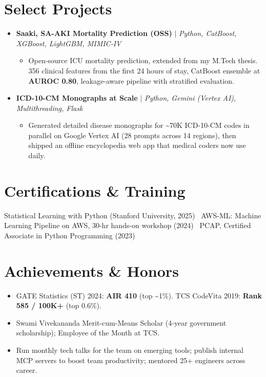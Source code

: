 \documentclass[letterpaper,11pt]{article}
\newcommand{\resumeItem}[1]{\item\small{{#1 \vspace{-2pt}}}}
\newcommand{\resumeProjectHeading}[2]{\item\small #1 #2\vspace{-7pt}}
\newcommand{\resumeSubHeadingListStart}{\begin{itemize}[leftmargin=0.15in, label={}]}
\newcommand{\resumeSubHeadingListEnd}{\end{itemize}}
\newcommand{\resumeItemListStart}{\begin{itemize}}
\newcommand{\resumeItemListEnd}{\end{itemize}\vspace{-5pt}}
\begin{document}
\section{Select Projects}
\resumeSubHeadingListStart

  \resumeProjectHeading
    {\textbf{Saaki, SA-AKI Mortality Prediction (OSS)} $|$ \emph{Python, CatBoost, XGBoost, LightGBM, MIMIC-IV}}{}
    \resumeItemListStart
      \resumeItem{Open-source ICU mortality prediction, extended from my M.Tech thesis. 356 clinical features from the first 24 hours of stay, CatBoost ensemble at \textbf{AUROC 0.80}, leakage-aware pipeline with stratified evaluation.}
    \resumeItemListEnd

  \resumeProjectHeading
    {\textbf{ICD-10-CM Monographs at Scale} $|$ \emph{Python, Gemini (Vertex AI), Multithreading, Flask}}{}
    \resumeItemListStart
      \resumeItem{Generated detailed disease monographs for \textasciitilde 70K ICD-10-CM codes in parallel on Google Vertex AI (28 prompts across 14 regions), then shipped an offline encyclopedia web app that medical coders now use daily.}
    \resumeItemListEnd

\resumeSubHeadingListEnd

\section{Certifications \& Training}
\begin{itemize}[leftmargin=0.15in, label={}]
\small{\item{
Statistical Learning with Python (Stanford University, 2025) \textbar\ AWS-ML: Machine Learning Pipeline on AWS, 30-hr hands-on workshop (2024) \textbar\ PCAP, Certified Associate in Python Programming (2023)
}}
\end{itemize}

\section{Achievements \& Honors}
\begin{itemize}[leftmargin=0.15in]
  \item \small GATE Statistics (ST) 2024: \textbf{AIR 410} (top \textasciitilde 1\%). TCS CodeVita 2019: \textbf{Rank 585 / 100K+} (top 0.6\%).
  \item \small Swami Vivekananda Merit-cum-Means Scholar (4-year government scholarship); Employee of the Month at TCS.
  \item \small Run monthly tech talks for the team on emerging tools; publish internal MCP servers to boost team productivity; mentored 25+ engineers across career.
\end{itemize}
\end{document}
